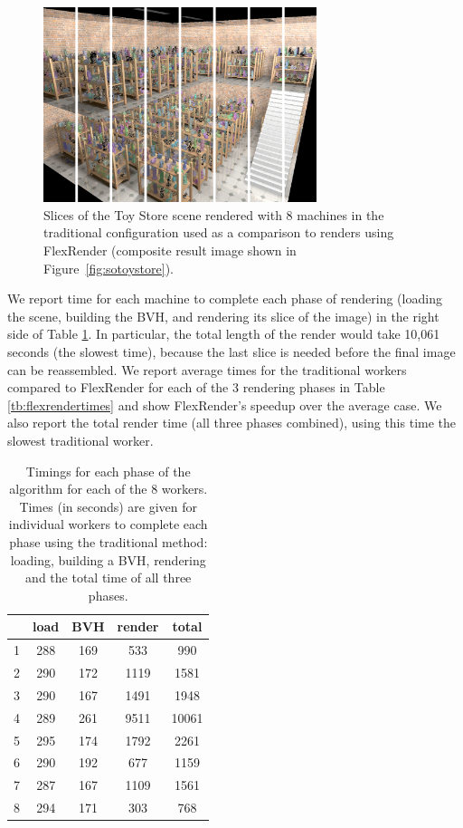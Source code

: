 \documentclass[a4paper,twoside]{article}
\begin{document}
\begin{figure}[h!]
    \centering
    \includegraphics[width=80mm]{images/toystore-sliced.png}

    \caption{Slices of the Toy Store scene rendered with 8 machines in the traditional configuration used as a comparison to renders using FlexRender (composite result image shown in Figure~\ref{fig:sotoystore}).}
    \label{fig:toystoresliced}
\end{figure}

We report time for each machine to complete each phase of rendering (loading
the scene, building the BVH, and rendering its slice of the image) in the right side of Table
\ref{tb:traditionaltimes}. In particular, the total length of the render would
take 10,061 seconds (the slowest time), because the last slice is needed before
the final image can be reassembled.  We report average times for the traditional workers
compared to FlexRender for each of the 3 rendering phases in Table
\ref{tb:flexrendertimes} and show FlexRender's speedup over the average case.  We also report the total render time (all three phases combined), using this
time the slowest traditional worker. 

\begin{table}
\begin{center}
\begin{tabular}{|l||c|c|c||c|}
    \hline
    & load & BVH & render & \textbf{total}\\
    \hline
    \hline
  1 & 288 & 169 & 533 & 990\\
    \hline
    2 & 290 & 172 & 1119 & 1581 \\
    \hline
    3 & 290 & 167 & 1491 & 1948 \\
    \hline
   4 &  289 & 261 & 9511 & 10061 \\
    \hline
    5 & 295 & 174 & 1792 & 2261 \\
    \hline
    6 & 290 & 192 & 677 & 1159\\
    \hline
    7 & 287 & 167 & 1109 & 1561 \\
    \hline
    8 & 294 & 171 & 303 & 768 \\
    \hline
\end{tabular}
\caption{Timings for each phase of the algorithm  for each of the 8 workers. Times (in seconds) are given for individual workers to complete each phase using the traditional method:  loading, building a BVH, rendering and the total time of all three phases.}
\label{tb:traditionaltimes}
\end{center}
\end{table}
\end{document}

